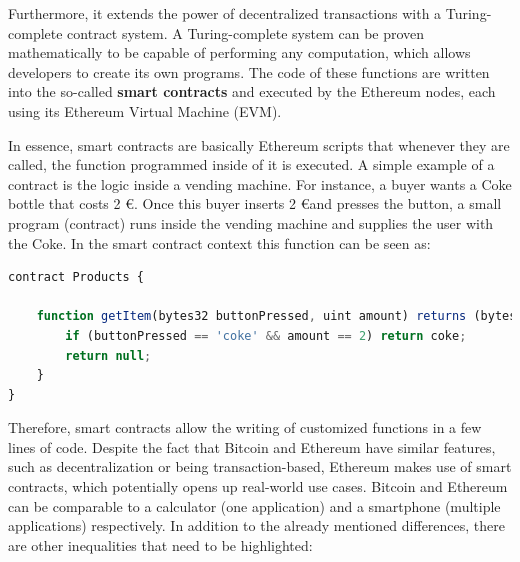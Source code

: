Furthermore, it extends the power of decentralized transactions with a Turing-complete contract system. A Turing-complete system can be proven mathematically to be capable of performing any computation, which allows developers to create its own programs. The code of these functions are written into the so-called \textbf{smart contracts} and executed by the Ethereum nodes, each using its Ethereum Virtual Machine (EVM).

In essence, smart contracts are basically Ethereum scripts that whenever they are called, the function programmed inside of it is executed. A simple example of a contract is the logic inside a vending machine. For instance, a buyer wants a Coke bottle that costs 2 \euro. Once this buyer inserts 2 \euro and presses the button, a small program (contract) runs inside the vending machine and supplies the user with the Coke. In the smart contract context this function can be seen as:
\newline

\begin{lstlisting}[language=JavaScript,caption={Example of an Ethereum contract simulating a vending machine. The defined function returns a bottle of Coke if 2 \euro are inserted.},label={lst:CokeExample}]
contract Products {

	function getItem(bytes32 buttonPressed, uint amount) returns (bytes32 item) {
		if (buttonPressed == 'coke' && amount == 2) return coke;
 		return null;
	}
}
\end{lstlisting}

Therefore, smart contracts allow the writing of customized functions in a few lines of code. Despite the fact that Bitcoin and Ethereum have similar features, such as decentralization or being transaction-based, Ethereum makes use of smart contracts, which potentially opens up real-world use cases. Bitcoin and Ethereum can be comparable to a calculator (one application) and a smartphone (multiple applications) respectively. In addition to the already mentioned differences, there are other inequalities that need to be highlighted:

